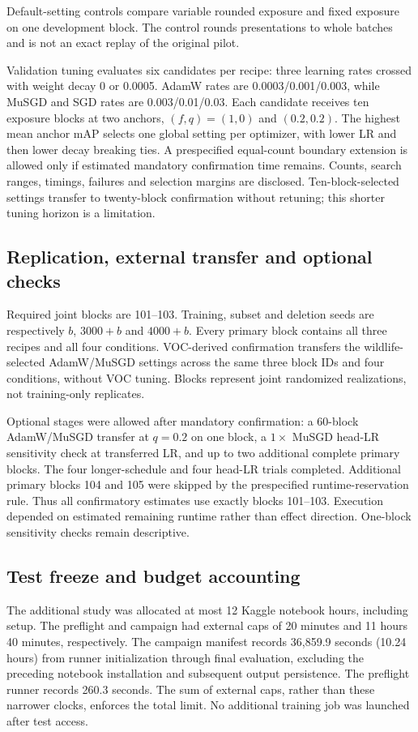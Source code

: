 \documentclass[11pt,a4paper]{article}
\begin{document}
Default-setting controls compare variable rounded exposure and fixed exposure on one development block. The control rounds presentations to whole batches and is not an exact replay of the original pilot.

Validation tuning evaluates six candidates per recipe: three learning rates crossed with weight decay 0 or 0.0005. AdamW rates are 0.0003/0.001/0.003, while MuSGD and SGD rates are 0.003/0.01/0.03. Each candidate receives ten exposure blocks at two anchors, $(f,q)=(1,0)$ and $(0.2,0.2)$. The highest mean anchor mAP selects one global setting per optimizer, with lower LR and then lower decay breaking ties. A prespecified equal-count boundary extension is allowed only if estimated mandatory confirmation time remains. Counts, search ranges, timings, failures and selection margins are disclosed. Ten-block-selected settings transfer to twenty-block confirmation without retuning; this shorter tuning horizon is a limitation.

\subsection{Replication, external transfer and optional checks}
Required joint blocks are 101--103. Training, subset and deletion seeds are respectively $b$, $3000+b$ and $4000+b$. Every primary block contains all three recipes and all four conditions. VOC-derived confirmation transfers the wildlife-selected AdamW/MuSGD settings across the same three block IDs and four conditions, without VOC tuning. Blocks represent joint randomized realizations, not training-only replicates.

Optional stages were allowed after mandatory confirmation: a 60-block AdamW/MuSGD transfer at $q=0.2$ on one block, a $1\times$ MuSGD head-LR sensitivity check at transferred LR, and up to two additional complete primary blocks. The four longer-schedule and four head-LR trials completed. Additional primary blocks 104 and 105 were skipped by the prespecified runtime-reservation rule. Thus all confirmatory estimates use exactly blocks 101--103. Execution depended on estimated remaining runtime rather than effect direction. One-block sensitivity checks remain descriptive.

\subsection{Test freeze and budget accounting}
The additional study was allocated at most 12 Kaggle notebook hours, including setup. The preflight and campaign had external caps of 20 minutes and 11 hours 40 minutes, respectively. The campaign manifest records 36,859.9 seconds (10.24 hours) from runner initialization through final evaluation, excluding the preceding notebook installation and subsequent output persistence. The preflight runner records 260.3 seconds. The sum of external caps, rather than these narrower clocks, enforces the total limit. No additional training job was launched after test access.
\end{document}
